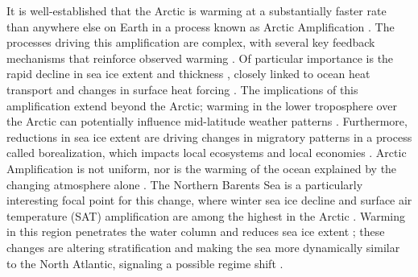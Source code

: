 \documentclass[draft]{agujournal2019}
\begin{document}
It is well-established that the Arctic is warming at a substantially faster rate than anywhere else on Earth in a process known as Arctic Amplification \cite{Manabe1980,Serreze2009,Cosimo2014,Huang2017,Rantanen2022}. The processes driving this amplification are complex, with several key feedback mechanisms that reinforce observed warming \cite{Pithan2014,Timmermans2018,Pistone2019,Previdi2021}. Of particular importance is the rapid decline in sea ice extent and thickness \cite{Perovich2009}, closely linked to ocean heat transport and changes in surface heat forcing \cite{Onarheim2018,Stroeve2018,Oldenburg2024}.
The implications of this amplification extend beyond the Arctic; warming in the lower troposphere over the Arctic can potentially influence mid-latitude weather patterns \cite{Honda2009,Petoukhov2010,Francis2012,Cohen2014}. Furthermore, reductions in sea ice extent are driving changes in migratory patterns in a process called borealization, which impacts local ecosystems and local economies \cite{Fossheim2015,Polyakov2020_borealization,Ingvaldsen2021}. Arctic Amplification is not uniform, nor is the warming of the ocean explained by the changing atmosphere alone \cite{Marshall2014}. The Northern Barents Sea is a particularly interesting focal point for this change, where winter sea ice decline and surface air temperature (SAT) amplification are among the highest in the Arctic \cite{Screen2010,Onarheim2017,Isaksen2022,Rantanen2022}. Warming in this region penetrates the water column \cite{Smedsrud2013} and reduces sea ice extent \cite{Onarheim2018,Previdi2021}; these changes are altering stratification and making the sea more dynamically similar to the North Atlantic, signaling a possible regime shift \cite{Arthun2012,Lind2018,Skagseth2020}.
\end{document}
